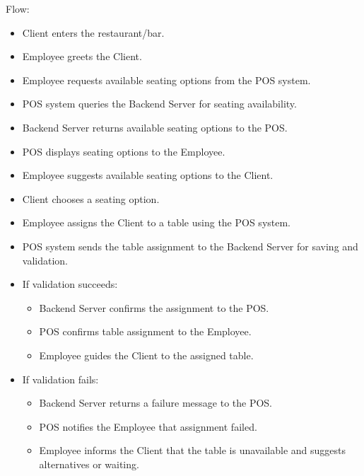 \documentclass[]{VUMIFTemplateClass}
\begin{document}
Flow:
\begin{itemize}
\setlength{\itemsep}{2pt}
\setlength{\parskip}{0pt}
\setlength{\parsep}{0pt}
\item Client enters the restaurant/bar.
\item Employee greets the Client.
\item Employee requests available seating options from the POS system.
\item POS system queries the Backend Server for seating availability.
\item Backend Server returns available seating options to the POS.
\item POS displays seating options to the Employee.
\item Employee suggests available seating options to the Client.
\item Client chooses a seating option.
\item Employee assigns the Client to a table using the POS system.
\item POS system sends the table assignment to the Backend Server for saving and validation.
\item If validation succeeds:
\begin{itemize}
\item Backend Server confirms the assignment to the POS.
\item POS confirms table assignment to the Employee.
\item Employee guides the Client to the assigned table.
\end{itemize}
\item If validation fails:
\begin{itemize}
\item Backend Server returns a failure message to the POS.
\item POS notifies the Employee that assignment failed.
\item Employee informs the Client that the table is unavailable and suggests alternatives or waiting.
\end{itemize}
\end{itemize}
\end{document}
